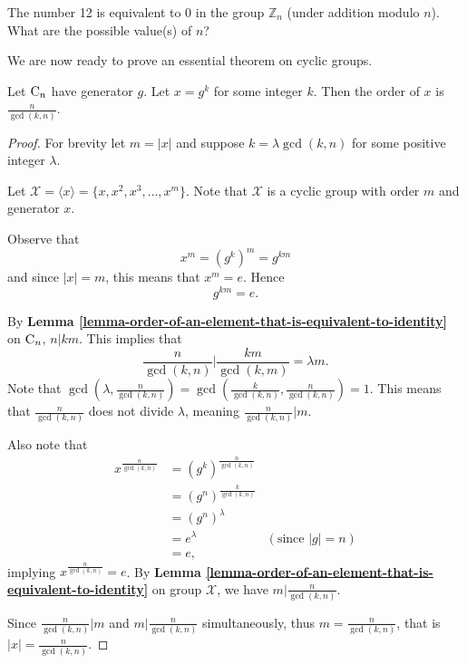 \begin{exercise}
    The number 12 is equivalent to 0 in the group $\mathbb{Z}_n$ (under addition modulo $n$). What are the possible value(s) of $n$?
\end{exercise}

We are now ready to prove an essential theorem on cyclic groups.
\begin{theorem}\label{thrm-order-of-element-in-cyclic-group}
    Let $\mathrm{C}_{n}$ have generator $g$. Let $x = g^k$ for some integer $k$. Then the order of $x$ is $\frac{n}{\gcd(k,n)}$.
\end{theorem}
\begin{proof}
    For brevity let $m = |x|$ and suppose $k = \lambda \gcd(k, n)$ for some positive integer $\lambda$.

    Let $\mathcal{X} = \langle x \rangle = \{x, x^2, x^3, \dots, x^m\}$. Note that $\mathcal{X}$ is a cyclic group with order $m$ and generator $x$.

    Observe that
    \[
        x^m = \left(g^k\right)^m = g^{km}
    \]
    and since $|x| = m$, this means that $x^m = e$. Hence
    \[
        g^{km} = e.
    \]

    By \textbf{Lemma \ref{lemma-order-of-an-element-that-is-equivalent-to-identity}} on $\mathrm{C}_{n}$, $n \vert km$. This implies that
    \[
        \frac{n}{\gcd(k,n)} \vert \frac{km}{\gcd(k,m)} = \lambda m.
    \]
    Note that $\gcd\left(\lambda, \frac{n}{\gcd(k,n)}\right) = \gcd\left(\frac{k}{\gcd(k,n)}, \frac{n}{\gcd(k,n)}\right) = 1$. This means that $\frac{n}{\gcd(k,n)}$ does not divide $\lambda$, meaning $\frac{n}{\gcd(k,n)} \vert m$.

    Also note that
    \begin{align*}
        x^{\frac{n}{\gcd(k,n)}} &= \left(g^k\right)^{\frac{n}{\gcd(k,n)}}\\
        &= \left(g^n\right)^{\frac{k}{\gcd(k,n)}}\\
        &= \left(g^n\right)^\lambda\\
        &= e^\lambda & (\text{since } |g| = n)\\
        &= e,
    \end{align*}
    implying $x^{\frac{n}{\gcd(k,n)}} = e$. By \textbf{Lemma \ref{lemma-order-of-an-element-that-is-equivalent-to-identity}} on group $\mathcal{X}$, we have $m \vert \frac{n}{\gcd(k,n)}$.

    Since $\frac{n}{\gcd(k,n)} \vert m$ and $m \vert \frac{n}{\gcd(k,n)}$ simultaneously, thus $m = \frac{n}{\gcd(k,n)}$, that is $|x| = \frac{n}{\gcd(k,n)}$.
\end{proof}


